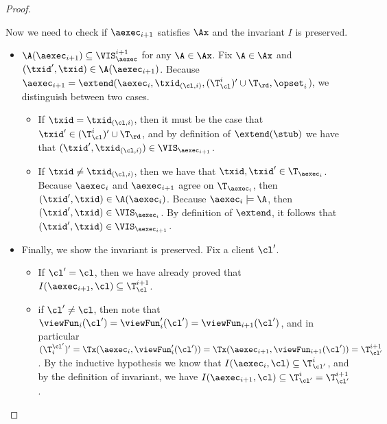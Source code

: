 \begin{proof}
\begin{itemize}
Now we need to check if \( \aexec_{i+1} \) satisfies \( \Ax\) and the invariant \( I \) is preserved.
\begin{itemize}
\item $\A(\aexec_{i+1}) \subseteq \VIS_{\aexec}^{i+1}$ for any $\A \in \Ax$.
Fix $\A \in \Ax$ and $(\txid', \txid) \in \A(\aexec_{i+1})$. 
Because $\aexec_{i+1} = \extend(\aexec_{i}, \txid_{(\cl, i)}, (\T_{\cl}^{i})' \cup \T_\rd, \opset_{i}$), 
we distinguish between two cases.
\begin{itemize}
\item If $\txid = \txid_{(\cl, i)}$, then it must be the case that $\txid' \in (\T^{i}_{\cl})' \cup \T_\rd$, 
and by definition of $\extend(\stub)$ we have that $(\txid' ,\txid_{(\cl, i)}) \in \VIS_{\aexec_{i+1}}$. 
\item If $\txid \neq \txid_{(\cl, i)}$, then we have that $\txid, \txid' \in \T_{\aexec_{i}}$. 
Because $\aexec_{i}$ and $\aexec_{i+1}$ agree on $\T_{\aexec_{i}}$, then $(\txid', \txid) \in \A(\aexec_{i})$.
Because $\aexec_{i} \models \A$, then $(\txid', \txid) \in \VIS_{\aexec_{i}}$. 
By definition of $\extend$, it follows that $(\txid', \txid) \in \VIS_{\aexec_{i+1}}$.
\end{itemize}

\item Finally, we show the invariant is preserved.
Fix a client $\cl'$. 
\begin{itemize}
\item If $\cl' = \cl$, then we have already proved that 
$I(\aexec_{i+1}, \cl) \subseteq \T_{\cl}^{i+1}$. 
\item if $\cl' \neq \cl$, then note that $\viewFun_{i}(\cl') = \viewFun'_{i}(\cl') = \viewFun_{i+1}(\cl')$, 
and in particular $(\T^{\cl'}_{i})' = \Tx(\aexec_{i}, \viewFun'_{i}(\cl')) = \Tx(\aexec_{i+1}, \viewFun_{i+1}(\cl')) =  \T_{\cl'}^{i+1}$.
By the inductive hypothesis we know that $I(\aexec_{i}, \cl) \subseteq \T_{\cl'}^{i}$, 
and by the definition of invariant, we have $I(\aexec_{i+1}, \cl) \subseteq \T_{\cl'}^{i} = \T_{\cl'}^{i+1}$. 
\end{itemize}
\end{itemize}
\end{itemize}
\end{proof}

